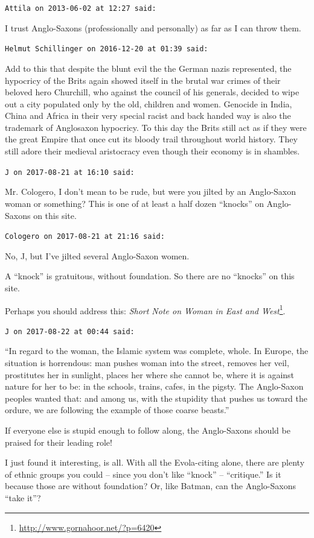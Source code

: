 \begin{footnotesize}
\begin{sffamily}
\texttt{Attila on 2013-06-02 at 12:27 said:}

I trust Anglo-Saxons (professionally and personally) as far as I can throw them.

\hfill

\texttt{Helmut Schillinger on 2016-12-20 at 01:39 said:}

Add to this that despite the blunt evil the the German nazis represented, the hypocricy of the Brits again showed itself in the brutal war crimes of their beloved hero Churchill, who against the council of his generals, decided to wipe out a city populated only by the old, children and women. Genocide in India, China and Africa in their very special racist and back handed way is also the trademark of Anglosaxon hypocricy. To this day the Brits still act as if they were the great Empire that once cut its bloody trail throughout world history. They still adore their medieval aristocracy even though their economy is in shambles.

\hfill

\texttt{J on 2017-08-21 at 16:10 said:}

Mr. Cologero, I don't mean to be rude, but were you jilted by an Anglo-Saxon woman or something? This is one of at least a half dozen ``knocks'' on Anglo-Saxons on this site.

\hfill

\texttt{Cologero on 2017-08-21 at 21:16 said:}

No, J, but I've jilted several Anglo-Saxon women.

A ``knock'' is gratuitous, without foundation. So there are no ``knocks'' on this site.

Perhaps you should address this: \textit{Short Note on Woman in East and West}\footnote{\url{http://www.gornahoor.net/?p=6420}}.

\hfill

\texttt{J on 2017-08-22 at 00:44 said:}

``In regard to the woman, the Islamic system was complete, whole. In Europe, the situation is horrendous: man pushes woman into the street, removes her veil, prostitutes her in sunlight, places her where she cannot be, where it is against nature for her to be: in the schools, trains, cafes, in the pigsty. The Anglo-Saxon peoples wanted that: and among us, with the stupidity that pushes us toward the ordure, we are following the example of those coarse beasts.''

If everyone else is stupid enough to follow along, the Anglo-Saxons should be praised for their leading role!

I just found it interesting, is all. With all the Evola-citing alone, there are plenty of ethnic groups you could -- since you don't like ``knock'' -- ``critique.'' Is it because those are without foundation? Or, like Batman, can the Anglo-Saxons ``take it''?

\hfill

\end{sffamily}
\end{footnotesize}

